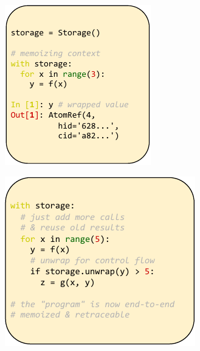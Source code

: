 \begin{figure}[h]
\begin{subfigure}{0.35\textwidth}
\includegraphics[width=\textwidth]{img/fig2.pdf}
\caption{}
\end{subfigure}
\begin{subfigure}{0.4\textwidth}
\centering
\includegraphics[width=\textwidth]{img/fig3.pdf}

\end{subfigure}
\end{figure}
